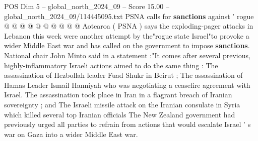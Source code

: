 \begin{textsample}{POS Dim 5 – global\_north\_2024\_09 – Score 15.00 – global\_north\_2024\_09/114445095.txt}
PSNA calls for \textbf{sanctions} against ' rogue @ @ @ @ @ @ @ @ @ @ Aotearoa ( PSNA ) says the exploding-pager attacks in Lebanon this week were another attempt by the"rogue state Israel"to provoke a wider Middle East war and has called on the government to impose \textbf{sanctions}.
National chair John Minto said in a statement :"It comes after several previous, highly-inflammatory Israeli actions aimed to do the same thing : The assassination of Hezbollah leader Fuad Shukr in Beirut ; The assassination of Hamas Leader Ismail Hanniyah who was negotiating a ceasefire agreement with Israel.
The assassination took place in Iran in a flagrant breach of Iranian sovereignty ; and The Israeli missile attack on the Iranian consulate in Syria which killed several top Iranian officials The New Zealand government had previously urged all parties to refrain from actions that would escalate Israel ' s war on Gaza into a wider Middle East war.

\end{textsample}
